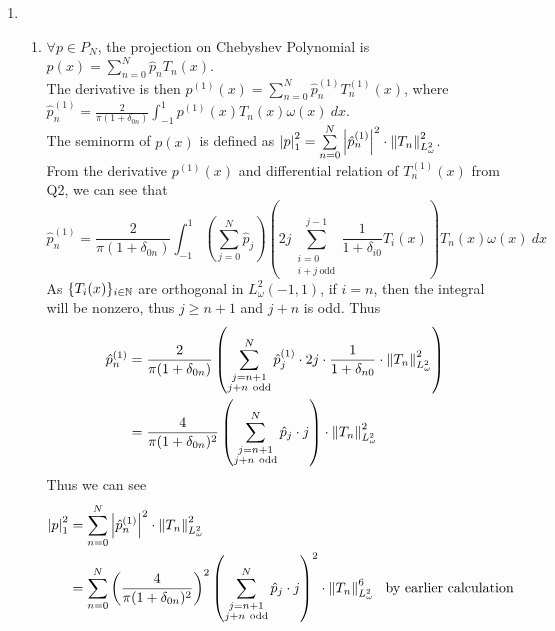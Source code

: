 \documentclass[a4paper,8pt]{article}
\begin{document}
\newpage
\begin{enumerate}[label=Q\arabic	*.]
\setlength{\itemsep}{0pt}
\setcounter{enumi}{2}
\item 
\begin{enumerate}[label=(\alph*)]
\setlength{\itemsep}{0pt}
\setcounter{enumii}{1}
\item $\forall p \in P_N$, the projection on Chebyshev Polynomial is $p(x) = \sum\limits_{n=0}^N \hat{p}_n T_n(x)$. \\
The derivative is then $p^{(1)}(x) = \sum\limits_{n=0}^N \hat{p}^{(1)}_n T^{(1)}_n(x)$, where $\hat{p}^{(1)}_n = \frac{2}{\pi(1+\delta_{0n})} \int^{1}_{-1} p^{(1)}(x) T_n(x) \omega(x) \ dx$.\\
The seminorm of $p(x)$ is defined as $\left\lvert p\right\rvert^2_1 = \sum\limits_{n=0}^N \left\lvert\hat{p}^{(1)}_n\right\rvert^2 \cdot \left\lVert T_n\right\rVert^2_{L^2_{\omega}}$.\\
From the derivative $p^{(1)}(x)$ and differential relation of $T^{(1)}_n(x)$ from Q2, we can see that 
\begin{equation}
\hat{p}^{(1)}_n = \frac{2}{\pi(1+\delta_{0n})} \int^{1}_{-1} \left(\sum^N_{j=0} \hat{p}_j\right) \left(2j \sum\limits^{j-1}_{\substack{i=0 \\ i + j \ \text{odd}}} \frac{1}{1+\delta_{i0}}T_i(x) \right) T_n(x) \omega(x) \ dx \nonumber
\end{equation}
As $\{T_i(x)\}_{i \in \mathbb{N}}$ are orthogonal in $L^2_{\omega} (-1,1)$, if $i = n$, then the integral will be nonzero, thus $j \geq n + 1$ and $j + n$ is odd. Thus
\begin{align}
\hat{p}^{(1)}_n &= \frac{2}{\pi(1+\delta_{0n})} \left(\sum^N_{\substack{j = n+1 \\ j + n \ \text{odd}}} \hat{p}^{(1)}_j \cdot 2j \cdot \frac{1}{1+\delta_{n0}} \cdot \left\lVert T_n\right\rVert^2_{L^2_{\omega}}\right) \nonumber \\
&= \frac{4}{\pi (1+\delta_{0n})^2} \left(\sum^N_{\substack{j = n+1 \\ j + n \ \text{odd}}} \hat{p}_j \cdot j \right) \cdot \left\lVert T_n\right\rVert^2_{L^2_{\omega}} \nonumber
\end{align}
Thus we can see
\begin{align}
\abs{p}^2_1 &= \sum\limits_{n=0}^N \abs{\hat{p}^{(1)}_n}^2 \cdot \norm{T_n}^2_{L^2_{\omega}} \nonumber \\
&= \sum\limits_{n=0}^N \left(\frac{4}{\pi (1+\delta_{0n})^2} \right)^2 \left(\sum^N_{\substack{j = n+1 \\ j + n \ \text{odd}}} \hat{p}_j \cdot j \right)^2 \cdot \norm{T_n}^6_{L^2_{\omega}} \ \ \text{by earlier calculation} \nonumber \\

\end{align}
\end{enumerate}
\end{enumerate}
\end{document}

